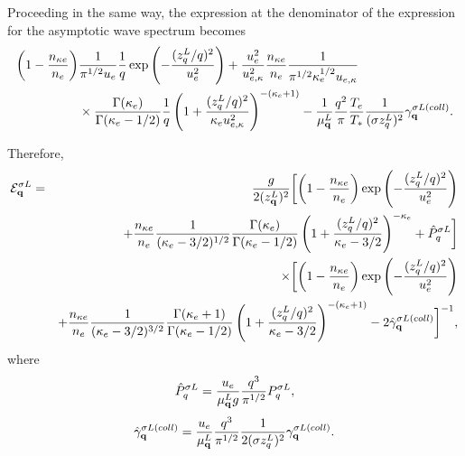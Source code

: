 \documentclass[12pt,a4paper,ruledheader]{report}
\begin{document}
\begin{appendix}
Proceeding in the same way, the expression at the denominator
of the expression for the asymptotic wave spectrum becomes
\begin{equation*}
  \begin{split}
   \left(1-\frac{n_{\kappa e}}{n_e}\right)
  &\frac{1}{\pi^{1/2} u_{e}}\frac{1}{q}
  \exp\left(-\frac{(z_q^L/q)^2}{u_{e}^2}\right)
  +\frac{u_e^2}{u_{e,\kappa}^2}
  \frac{n_{\kappa e}}{n_e}
  \frac{1}{\pi^{1/2} \kappa_e^{1/2} u_{e,\kappa}}\\
  &\times\frac{\Gamma(\kappa_e)}{\Gamma(\kappa_e-1/2)}
  \frac{1}{q}\left(1+\frac{(z_q^L/q)^2}{\kappa_e u_{e,\kappa}^2}
  \right)^{-(\kappa_e+1)}
  -\frac{1}{\mu_{\bf q}^L}\frac{q^2}{\pi}
  \frac{T_e}{T_*}\frac{1}{(\sigma z_q^L)^2}
  \gamma_{\bf q}^{\sigma L(coll)}.
 \end{split}
\end{equation*}

Therefore,
\begin{eqnarray}
\label{L,asymp}
{\cal E}_{\bf q}^{\sigma L}&=& 
\frac{g}{2(z_{\bf q}^L)^2}
\biggl[\left(1-\frac{n_{\kappa e}}{n_e}\right)
\exp\left(-\frac{(z_q^L/q)^2}{u_{e}^2}\right)\nonumber\\
&&+\frac{n_{\kappa e}}{n_e}
\frac{1}{(\kappa_e-3/2)^{1/2}}
\frac{\Gamma(\kappa_e)}{\Gamma(\kappa_e-1/2)}
\left(1+\frac{(z_q^L/q)^2}{\kappa_e-3/2}
\right)^{-\kappa_e}+\hat{P}_q^{\sigma L}\biggr]\nonumber\\
&&\times \biggl[\left(1-\frac{n_{\kappa e}}{n_e}\right)
\exp\left(-\frac{(z_q^L/q)^2}{u_{e}^2}\right)\\
&&+\frac{n_{\kappa e}}{n_e}
\frac{1}{(\kappa_e-3/2)^{3/2}}
\frac{\Gamma(\kappa_e+1)}{\Gamma(\kappa_e-1/2)}
\left(1+\frac{(z_q^L/q)^2}{\kappa_e-3/2}
   \right)^{-(\kappa_e+1)}-2\hat{\gamma}_{\bf q}^{\sigma L(coll)}\biggr]^{-1},
   \nonumber
\end{eqnarray}
where
\begin{equation}
  \hat{P}_q^{\sigma L}= \frac{u_e}{\mu_{\bf q}^L g}\frac{q^3}{\pi^{1/2}}
  P_q^{\sigma L},
\end{equation}
\begin{equation}
  \hat{\gamma}_{\bf q}^{\sigma L(coll)}= \frac{u_e}{\mu_{\bf q}^L}
  \frac{q^3}{\pi^{1/2}}\frac{1}{2(\sigma z_q^L)^2}
  \gamma_{\bf q}^{\sigma L(coll)}.
\end{equation}


\end{appendix}
\end{document}
